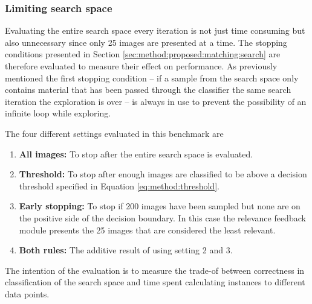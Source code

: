 \subsubsection{Limiting search space}
\label{sec:method:eval:param:stopping}

Evaluating the entire search space every iteration is not just time consuming but also unnecessary since only 25 images are presented at a time. The stopping conditions presented in Section \ref{sec:method:proposed:matching:search} are therefore evaluated to measure their effect on performance.
As previously mentioned the first stopping condition -- if a sample from the search space only contains material that has been passed through the classifier the same search iteration the exploration is over --  is always in use to prevent the possibility of an infinite loop while exploring. 

The four different settings evaluated in this benchmark are
\begin{enumerate}
	\item \textbf{All images:} To stop after the entire search space is evaluated. 
	\item \textbf{Threshold:} To stop after enough images are classified to be above a decision threshold specified in Equation \ref{eq:method:threshold}. 
	\item \textbf{Early stopping:} To stop if 200 images have been sampled but none are on the positive side of the decision boundary. In this case the relevance feedback module presents the 25 images that are considered the least relevant. 
	\item \textbf{Both rules:} The additive result of using setting 2 and 3.
\end{enumerate} 
\medskip

The intention of the evaluation is to measure the trade-of between correctness in classification of the search space and time spent calculating instances to different data points.
